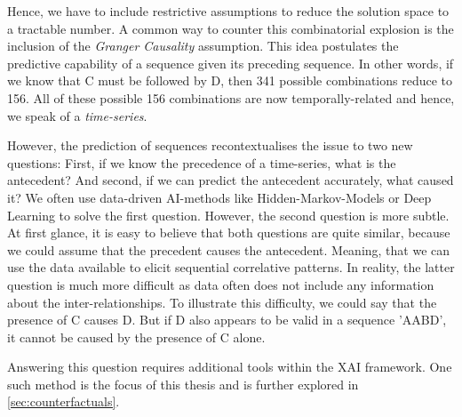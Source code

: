 \documentclass[./../../paper.tex]{subfiles}
\begin{document}
Hence, we have to include restrictive assumptions to reduce the solution space to a tractable number. A common way to counter this combinatorial explosion is the inclusion of the \emph{Granger Causality} assumption. 
This idea postulates the predictive capability of a sequence given its preceding sequence. 
In other words, if we know that C must be followed by D, then 341 possible combinations reduce to 156. All of these possible 156 combinations are now temporally-related and hence, we speak of a \emph{time-series}.


However, the prediction of sequences recontextualises the issue to two new questions: 
First, if we know the precedence of a time-series, what is the antecedent? 
And second, if we can predict the antecedent accurately, what caused it? 
We often use data-driven AI-methods like Hidden-Markov-Models or Deep Learning to solve the first question. 
However, the second question is more subtle. At first glance, it is easy to believe that both questions are quite similar, because we could assume that the precedent causes the antecedent. Meaning, that we can use the data available to elicit sequential correlative patterns. 
In reality, the latter question is much more difficult as data often does not include any information about the inter-relationships. 
To illustrate this difficulty, we could say that the presence of C causes D. 
But if D also appears to be valid in a sequence 'AABD', it cannot be caused by the presence of C alone. 

Answering this question requires additional tools within the \gls{XAI} framework. 
One such method is the focus of this thesis and is further explored in \autoref{sec:counterfactuals}.
\end{document}
